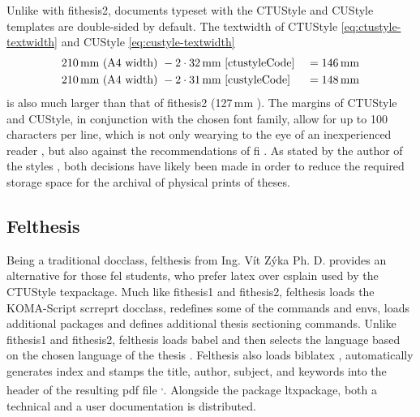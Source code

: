     Unlike with fithesis2, documents typeset with the CTUStyle and CUStyle templates are double-sided by default. The \gls{textwidth} of CTUStyle \eqref{eq:ctustyle-textwidth} and CUStyle \eqref{eq:custyle-textwidth}\begin{align}
      \label{eq:ctustyle-textwidth} 210\text{\,mm} \text{ (A4 width) } &- 2\cdot32\text{\,mm} \text{ \cite[line~249]{ctustyleCode} } &= 146\text{\,mm} \\
      \label{eq:custyle-textwidth}  210\text{\,mm} \text{ (A4 width) } &- 2\cdot31\text{\,mm} \text{ \cite[line~229]{custyleCode} } &= 148\text{\,mm}
    \end{align} is also much larger than that of fithesis2 (127\,mm \cite[lines~989, 1017, 1045]{fithesis2Code}). The margins of CTUStyle and CUStyle, in conjunction with the chosen font family, \label{overlong-lines} allow for up to 100 characters per line, which is not only wearying to the eye of an inexperienced reader \cite[section~2.1.2]{eletypostyle}, but also against the recommendations of \gls{fi} \cite[section~3.2.3]{bpdpfi}. As stated by the author of the styles \cite[post~25]{ctustyle-forums}, both decisions have likely been made in order to reduce the required storage space for the archival of physical prints of theses.

    \subsection{Felthesis}\label{sec:felthesis}
    Being a traditional \gls{docclass}, felthesis from Ing. Vít Zýka Ph. D. provides an alternative for those \gls{fel} students, who prefer \gls{latex} over \gls{csplain} used by the CTUStyle \gls{texpackage}. Much like fithesis1 and fithesis2, felthesis loads the KOMA-Script scrreprt \gls{docclass}, redefines some of the commands and \glspl{env}, loads additional packages and defines additional thesis sectioning commands. Unlike fithesis1 and fithesis2, felthesis loads babel and then selects the language based on the chosen language of the thesis \cite[lines~687--691]{felthesisCode}. Felthesis also loads biblatex\pending{} \cite[line~722]{felthesisCode}, automatically generates index\pending{} \cite[line~763]{felthesisCode} and stamps the title, author, subject, and keywords into the header of the resulting \gls{pdf} file \cite[lines~959--971]{felthesisCode}\label{pdf-stamping}\textsuperscript{,}. Alongside the package \gls{ltxpackage}, both a technical \cite{felthesisCode} and a user documentation \cite{felthesis} is distributed\pending{}.

